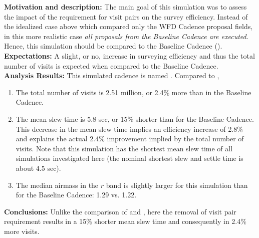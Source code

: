 

{\bf Motivation and description:} The main goal of this simulation was
to assess the impact of the requirement for visit pairs on the survey
efficiency. Instead of the idealized case above which compared only
the WFD Cadence proposal fields, in this more realistic case
{\it all proposals from the Baseline Cadence are executed}. Hence, this
simulation should be compared to the Baseline Cadence
(). \\

{\bf Expectations:} A slight, or no, increase in surveying efficiency
and thus the total number of visits is expected when compared to the
Baseline Cadence. \\

{\bf Analysis Results:}  This simulated cadence is named
. Compared to ,
\begin{enumerate}
\item The total number of visits is 2.51 million, or 2.4\% more than
in the Baseline Cadence.
\item The mean slew time is 5.8 sec, or 15\% shorter than for the Baseline
Cadence. This decrease in the mean slew time implies an efficiency
increase of 2.8\% and explains the actual 2.4\% improvement implied by
the total number of visits.  Note that this simulation has the
shortest mean slew time of all simulations investigated here (the
nominal shortest slew and settle time is about 4.5 sec).
\item The median airmass in the $r$ band is slightly larger for this
simulation than for the Baseline Cadence: 1.29 vs. 1.22.
\end{enumerate}


{\bf Conclusions:}
Unlike the comparison of  and
, here the removal of visit pair requirement
results in a 15\% shorter mean slew time and consequently in 2.4\%
more visits.

%

